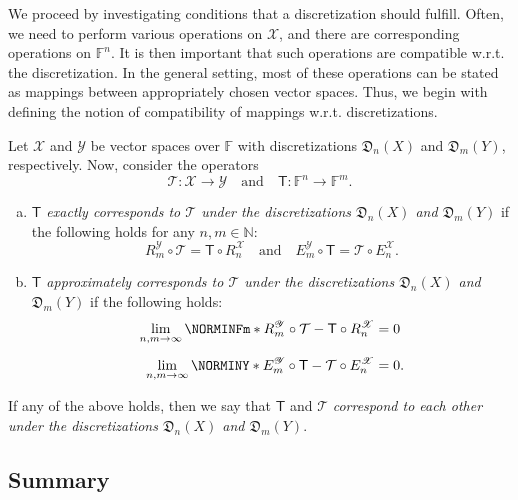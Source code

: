 \documentclass[a4paper]{paper}
\makeatletter
\newcommand*{\SPC}[1]{{\ensuremath{\mathscr{#1}}}}
\newcommand*{\SPCX}{\SPC{X}}
\newcommand*{\SPCY}{\SPC{Y}}
\newcommand{\FIELD}{{\ensuremath{\mathbb{F}}}}
\newcommand*{\Fn}{{\ensuremath{\FIELD^n}}}
\newcommand*{\Fm}{{\ensuremath{\FIELD^m}}}
\newcommand{\NN}{{\ensuremath{\mathbb{N}}}}
\newcommand*{\OP}[1]{{\ensuremath{\mathcal{#1}}}}
\newcommand*{\OPT}{\OP{T}}
\newcommand{\DISCOP}[1]{{\ensuremath{\mathsf{#1}}}}
\newcommand*{\DISCOPT}{\DISCOP{T}}
\newcommand*{\EXT}[2]{\ensuremath{E_{#1}^{#2}}}
\newcommand*{\REST}[2]{\ensuremath{R_{#1}^{#2}}}
\newcommand*{\RnX}{{\ensuremath{\REST{n}{\SPC{X}}}}}
\newcommand*{\RmY}{{\ensuremath{\REST{m}{\SPC{Y}}}}}
\newcommand*{\EnX}{{\ensuremath{\EXT{n}{\SPC{X}}}}}
\newcommand*{\EmY}{{\ensuremath{\EXT{m}{\SPC{Y}}}}}
\newcommand*{\DISCR}[2]{{\ensuremath{\mathfrak{D}_{#2}(#1)}}}
\newcommand*{\DISCRnX}{\DISCR{X}{n}}
\newcommand*{\DISCRmY}{\DISCR{Y}{m}}
\newcommand{\wrt}{{w.r.t.}\@\xspace}
\makeatother
\begin{document}
We proceed by investigating conditions that a discretization should fulfill. Often, we need to perform various 
operations on $\SPCX$, and there are corresponding operations on $\Fn$. It is then important that such 
operations are compatible \wrt the discretization. In the general setting, most of these operations can be stated as 
mappings between appropriately chosen vector spaces. Thus, we begin with defining the notion of compatibility of 
mappings \wrt discretizations. 
%
\begin{definition}
 \label{def:discr:corresp:operator_compat}
 Let $\SPCX$ and $\SPCY$ be vector spaces over $\FIELD$ with discretizations $\DISCRnX$ and 
 $\DISCRmY$, respectively. Now, consider the operators
 \begin{equation*}
  \OPT \colon \SPCX \to \SPCY \quad\text{and}\quad \DISCOPT \colon \Fn \to \Fm.
 \end{equation*}
 \vspace{-2\baselineskip}
 \begin{enumerate}[(a)]
  \item \label{def:discr:corresp:operator_compat:a_exact}
  \emph{$\DISCOPT$ exactly corresponds to $\OPT$ under the discretizations $\DISCRnX$ and  
  $\DISCRmY$} if the following holds for any $n,m \in \NN$:
  \begin{equation*}
   \RmY \circ \OPT = \DISCOPT \circ \RnX  \quad\text{and}\quad  \EmY \circ \DISCOPT = \OPT \circ \EnX.
  \end{equation*}

  \item \label{def:discr:corresp:operator_compat:b_approx}
  \emph{$\DISCOPT$ approximately corresponds to $\OPT$ under the discretizations $\DISCRnX$ and 
  $\DISCRmY$} if the following holds:
  \begin{align*} 
   \lim_{n,m\to \infty} \NORMINFm*{\RmY \circ \OPT - \DISCOPT \circ \RnX} &= 0  \\[0.5em]
   \lim_{n,m\to \infty} \NORMINY*{\EmY \circ \DISCOPT - \OPT \circ \EnX} &= 0.
  \end{align*}
 \end{enumerate}  
 If any of the above holds, then we say that $\DISCOPT$ and $\OPT$ \emph{correspond to each other under the 
 discretizations $\DISCRnX$ and $\DISCRmY$}.
\end{definition}



\subsection{Summary}
\label{subsec:discr:summary}
\end{document}
